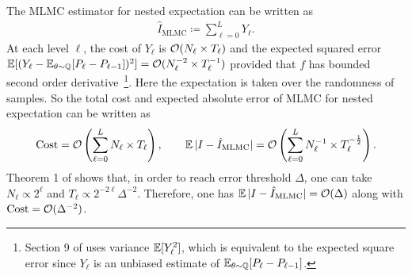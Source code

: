 The MLMC estimator for nested expectation can be written as 
\begin{align}
    \hat{I}_{\text{MLMC}} \coloneq \sum_{\ell=0}^L Y_\ell .
\end{align}
At each level $\ell$, the cost of $Y_\ell$ is $\mathcal{O}(N_\ell \times T_\ell)$ and the expected squared error $\operatorname{\mathbb{E}}[(Y_\ell - \operatorname{\mathbb{E}}_{\theta \sim \mathbb{Q}}[P_\ell - P_{\ell-1}])^2] = \mathcal{O}(N_\ell^{-2} \times T_\ell^{-1})$ provided that $f$ has bounded second order derivative~\citep[Section 9]{Giles2015}\footnote{Section 9 of \cite{Giles2015} uses variance $\operatorname{\mathbb{E}}[Y_\ell^2]$, which is equivalent to the expected square error since $Y_\ell$ is an unbiased estimate of $\operatorname{\mathbb{E}}_{\theta \sim \mathbb{Q}}[P_\ell - P_{\ell-1}]$.}. 
Here the expectation is taken over the randomness of samples. So the total cost and expected absolute error of MLMC for nested expectation can be written as
\begin{align}\label{eq:cost_error_mlmc}
    \text{Cost} = \mathcal{O}\left( \sum_{\ell=0}^L N_\ell \times T_\ell \right), \qquad \operatorname{\mathbb{E}}|I - \hat{I}_{\text{MLMC}}| = \mathcal{O}\left( \sum_{\ell=0}^L N_\ell^{-1} \times T_\ell^{-\frac{1}{2}} \right).
\end{align}
Theorem 1 of \cite{Giles2015} shows that, in order to reach error threshold $\Delta$, one can take $N_\ell \propto 2^\ell$ and $T_\ell \propto 2^{-2 \ell} \Delta^{-2}$. Therefore, one has $\operatorname{\mathbb{E}} |I - \hat{I}_{\text{MLMC}}| = \mathcal{O}(\Delta)$ along with $\text{Cost} = \mathcal{O}(\Delta^{-2})$.


